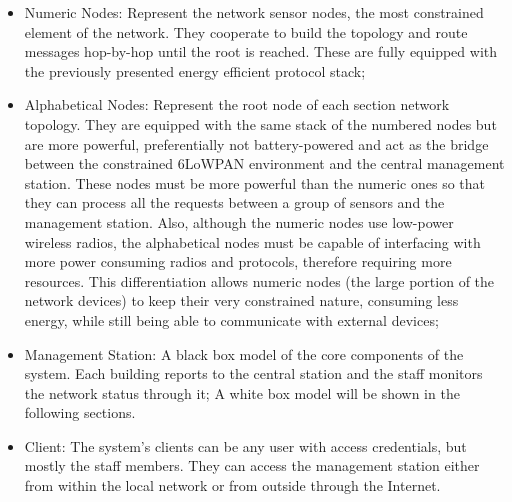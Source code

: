 \documentclass{llncs}
\begin{document}
\begin{itemize}
	\item Numeric Nodes: Represent the network sensor nodes, the most constrained element of the network. 
	They cooperate to build the topology and route messages hop-by-hop until the root is reached. 
	These are fully equipped with the previously presented energy efficient protocol stack;
	\item Alphabetical Nodes: Represent the root node of each section network topology.
	They are equipped with the same stack of the numbered nodes but are more powerful, preferentially not battery-powered and act as the bridge between the constrained 6LoWPAN environment and the central management station. 
	These nodes must be more powerful than the numeric ones so that they can process all the requests between a group of sensors and the management station. 
	Also, although the numeric nodes use low-power wireless radios, the alphabetical nodes must be capable of interfacing with more power consuming radios and protocols, therefore requiring more resources. 
	This differentiation allows numeric nodes (the large portion of the network devices) to keep their very constrained nature, consuming less energy, while still being able to communicate with external devices;
	\item Management Station: A black box model of the core components of the system. 
	Each building reports to the central station and the staff monitors the network status through it;
	A white box model will be shown in the following sections.
	\item Client: The system's clients can be any user with access credentials, but mostly the staff members. 
	They can access the management station either from within the local network or from outside through the Internet.
\end{itemize}
 
\end{document}
